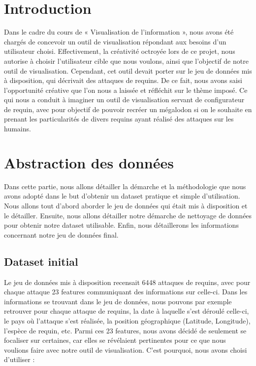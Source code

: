 \documentclass{article}
\begin{document}
\clearpage
\section{Introduction}

Dans le cadre du cours de « Visualisation de l’information », nous avons été chargés de concevoir un outil de visualisation répondant aux besoins d’un utilisateur choisi. Effectivement, la créativité octroyée lors de ce projet, nous autorise à choisir l’utilisateur cible que nous voulons, ainsi que l’objectif de notre outil de visualisation. Cependant, cet outil devait porter sur le jeu de données mis à disposition, qui décrivait des attaques de requins.
De ce fait, nous avons saisi l’opportunité créative que l’on nous a laissée et réfléchit sur le thème imposé. Ce qui nous a conduit à imaginer un outil de visualisation servant de configurateur de requin, avec pour objectif de pouvoir recréer un mégalodon si on le souhaite en prenant les particularités de divers requins ayant réalisé des attaques sur les humains.

\clearpage
\section{Abstraction des données}

Dans cette partie, nous allons détailler la démarche et la méthodologie que nous avons adopté dans le but d’obtenir un dataset pratique et simple d’utilisation. Nous allons tout d’abord aborder le jeu de données qui était mis à disposition et le détailler. Ensuite, nous allons détailler notre démarche de nettoyage de données pour obtenir notre dataset utilisable. Enfin, nous détaillerons les informations concernant notre jeu de données final.

\subsection{Dataset initial}

Le jeu de données mis à disposition recensait 6448 attaques de requins, avec pour chaque attaque 23 features communiquant des informations sur celle-ci. Dans les informations se trouvant dans le jeu de données, nous pouvons par exemple retrouver pour chaque attaque de requins, la date à laquelle s’est déroulé celle-ci, le pays où l’attaque s’est réalisée, la position géographique (Latitude, Longitude), l’espèce de requin, etc.
Parmi ces 23 features, nous avons décidé de seulement se focaliser sur certaines, car elles se révélaient pertinentes pour ce que nous voulions faire avec notre outil de visualisation.
C’est pourquoi, nous avons choisi d’utiliser :
\end{document}
